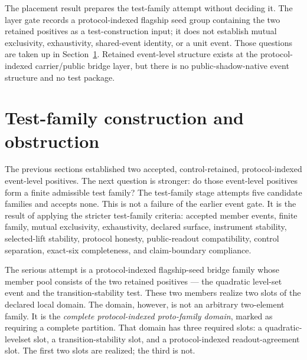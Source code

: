 \documentclass[11pt]{article}
\theoremstyle{definition}
\begin{document}
The placement result prepares the test-family attempt without deciding it. The layer gate records a protocol-indexed flagship seed group containing the two retained positives as a test-construction input; it does not establish mutual exclusivity, exhaustivity, shared-event identity, or a unit event. Those questions are taken up in Section~\ref{sec:test-families}. Retained event-level structure exists at the protocol-indexed carrier/public bridge layer, but there is no public-shadow-native event structure and no test package.
 \section{Test-family construction and obstruction}
\label{sec:test-families}

The previous sections established two accepted, control-retained, protocol-indexed event-level positives. The next question is stronger: do those event-level positives form a finite admissible test family? The test-family stage attempts five candidate families and accepts none. This is not a failure of the earlier event gate. It is the result of applying the stricter test-family criteria: accepted member events, finite family, mutual exclusivity, exhaustivity, declared surface, instrument stability, selected-lift stability, protocol honesty, public-readout compatibility, control separation, exact-six completeness, and claim-boundary compliance.

The serious attempt is a protocol-indexed flagship-seed bridge family whose member pool consists of the two retained positives — the quadratic level-set event and the transition-stability test. These two members realize two slots of the declared local domain. The domain, however, is not an arbitrary two-element family. It is the \emph{complete protocol-indexed proto-family domain}, marked as requiring a complete partition. That domain has three required slots: a quadratic-levelset slot, a transition-stability slot, and a protocol-indexed readout-agreement slot. The first two slots are realized; the third is not.
\end{document}
